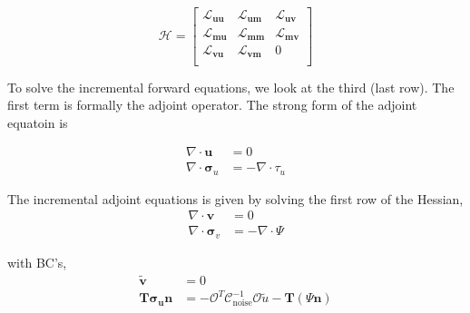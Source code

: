 \documentclass[12pt]{article}
\newcommand{\mm}{{\ensuremath{\boldsymbol{m}}}}
\newcommand{\uu}{{\ensuremath{\boldsymbol{u}}}}
\newcommand{\vv}{{\ensuremath{\boldsymbol{v}}}}
\newcommand{\ssigma}{{\ensuremath{\boldsymbol{\sigma}}}}
\begin{document}
\begin{equation}
\mathcal{H} = 
\begin{bmatrix}
\mathcal{L}_{\uu\uu} & \mathcal{L}_{\uu\mm} & \mathcal{L}_{\uu\vv} \\
\mathcal{L}_{\mm\uu} & \mathcal{L}_{\mm\mm} & \mathcal{L}_{\mm\vv} \\
\mathcal{L}_{\vv\uu} & \mathcal{L}_{\vv\mm} & 0 \\
\end{bmatrix}
\end{equation}


To solve the incremental forward equations, we look at the third (last row). The first term is formally the adjoint operator. The strong form of the adjoint equatoin is 

\begin{equation}
\begin{split}
\nabla \cdot \uu &= 0 \\
\nabla \cdot \ssigma_u & = -\nabla \cdot \tau_u
\end{split}
\end{equation}

The incremental adjoint equations is given by solving the first row of the Hessian,
\begin{equation}
\begin{split}
\nabla \cdot \vv & = 0\\
\nabla \cdot \ssigma_v & = -\nabla \cdot \Psi 
\end{split}
\end{equation}

with BC's,
\begin{equation}
\begin{split}
\tilde{\vv}&=0 \\
\textbf{T}\ssigma_\uu\textbf{n}&= -\mathcal O^T\mathcal C^{-1}_{\text{noise}}\mathcal O \tilde{u}-\textbf{T}(\Psi\textbf{n})
\end{split}
\end{equation}
\end{document}
